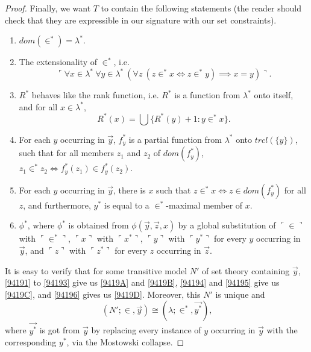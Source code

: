\documentclass[12pt, twoside]{memoir}
\numberwithin{equation}{section}
\theoremstyle{definition}
\theoremstyle{remark}
\theoremstyle{definition}
\theoremstyle{definition}
\theoremstyle{definition}
\theoremstyle{remark}
\begin{document}
\begin{proof}
Finally, we want $T$ to contain the following statements (the reader should check that they are expressible in our signature with our set constraints).
\begin{enumerate}[label=(\arabic*)]
    \item\label{94191} $dom(\in^*) = \lambda^*$.
    \item\label{94192} The extensionality of $\in^*$, i.e.
    \begin{equation*}
        \ulcorner \forall x \in \lambda^* \ \forall y \in \lambda^* \ (\forall z \ (z \in^* x \iff z \in^* y) \implies x = y) \urcorner \text{.}
    \end{equation*}
    \item\label{94193} $R^*$ behaves like the rank function, i.e. $R^*$ is a function from $\lambda^*$ onto itself, and for all $x \in \lambda^*$,
    \begin{equation*}
        R^*(x) = \bigcup \{R^*(y) + 1 : y \in^* x\} \text{.}
    \end{equation*}
    \item\label{94194} For each $y$ occurring in $\Vec{y}$, $f_y^*$ is a partial function from $\lambda^*$ onto $trcl(\{y\})$, such that for all members $z_1$ and $z_2$ of $dom(f_y^*)$, $z_1 \in^* z_2 \iff f_y^*(z_1) \in f_y^*(z_2)$.
    \item\label{94195} For each $y$ occurring in $\Vec{y}$, there is $x$ such that $z \in^* x \iff z \in dom(f_y^*)$ for all $z$, and furthermore, $y^*$ is equal to a $\in^*$-maximal member of $x$.
    \item\label{94196} $\phi^*$, where $\phi^*$ is obtained from $\phi(\Vec{y}, \Vec{z}, x)$ by a global substitution of $\ulcorner \in \urcorner$ with $\ulcorner \in^* \urcorner$, $\ulcorner x \urcorner$ with $\ulcorner x^* \urcorner$, $\ulcorner y \urcorner$ with $\ulcorner y^* \urcorner$ for every $y$ occurring in $\Vec{y}$, and $\ulcorner z \urcorner$ with $\ulcorner z^* \urcorner$ for every $z$ occurring in $\Vec{z}$.
\end{enumerate}
It is easy to verify that for some transitive model $N'$ of set theory containing $\Vec{y}$, \ref{94191} to \ref{94193} give us \ref{9419A} and \ref{9419B}, \ref{94194} and \ref{94195} give us \ref{9419C}, and \ref{94196} gives us \ref{9419D}. Moreover, this $N'$ is unique and 
\begin{equation}\label{eq943'}
    (N'; \in, \Vec{y}) \cong (\lambda; \in^*, \Vec{y^*}) \text{,}
\end{equation}
where $\Vec{y^*}$ is got from $\Vec{y}$ by replacing every instance of $y$ occurring in $\Vec{y}$ with the corresponding $y^*$, via the Mostowski collapse.


\end{proof}
\end{document}
